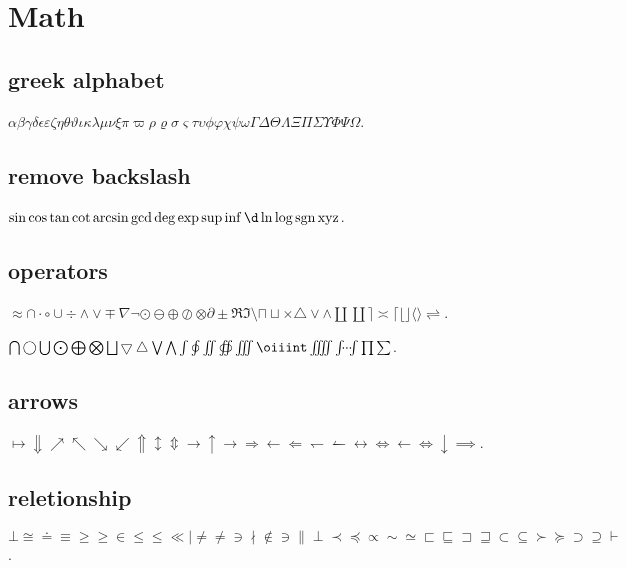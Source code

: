 \documentclass{ctexbook}
\DeclareMathOperator{\sgn}{sgn}
\begin{document}
\section{Math}
\subsection{greek alphabet}
\(\alpha\beta\gamma\delta\epsilon\varepsilon\zeta\eta\theta\vartheta\iota\kappa\lambda\mu\nu\xi\pi\varpi\rho\varrho\sigma\varsigma\tau\upsilon\phi\varphi\chi\psi\omega\Gamma\Delta\Theta\Lambda\Xi\Pi\Sigma\Upsilon\Phi\Psi\Omega\).

\subsection{remove backslash}
\(\sin \cos \tan \cot \arcsin \gcd \deg \exp \sup \inf \d \ln \log \sgn \operatorname{xyz}\).

\subsection{operators}
\(\approx \cap \cdot \circ \cup \div \land \lor \mp \nabla \neg \odot \ominus \oplus \oslash \otimes \partial \pm \Re \Im \setminus \sqcap \sqcup \times \triangle \vee \wedge \amalg \coprod \rceil \asymp \lceil \lfloor \rfloor \langle \rangle \rightleftharpoons \).

\(\bigcap \bigcirc \bigcup \bigodot \bigoplus \bigotimes \bigsqcup \bigtriangledown \bigtriangleup \bigvee \bigwedge \int \oint \iint \oiint \iiint \oiiint \iiiint \idotsint \prod \sum \).

\subsection{arrows}
\(\mapsto \Downarrow \nearrow \nwarrow \searrow \swarrow \Uparrow \updownarrow \Updownarrow \to \uparrow \rightarrow \Rightarrow \leftarrow \Leftarrow \leftharpoondown \leftharpoonup \leftrightarrow \Leftrightarrow \gets \iff \downarrow \implies\).

\subsection{reletionship}
\(\bot \cong \doteq \equiv \ge \geq \in \le \leq \ll \mid \ne \neq \ni \nmid \notin \owns \parallel \perp \prec \preceq \propto \sim \simeq \sqsubset \sqsubseteq \sqsupset \sqsupseteq \subset \subseteq \succ \succeq \supset \supseteq \vdash \).
\end{document}
